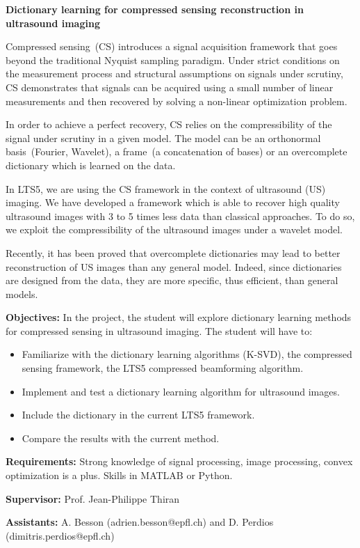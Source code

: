 \documentclass{article}
\newcommand\skipline{\vspace{\baselineskip}}
\begin{document}
\textbf{Dictionary learning for compressed sensing reconstruction in ultrasound imaging}

\skipline
\par Compressed sensing~(CS) introduces a signal acquisition framework that goes beyond the traditional Nyquist sampling paradigm. Under strict conditions on the measurement process and structural assumptions on signals under scrutiny, CS demonstrates that signals can be acquired using a small number of linear measurements and then recovered by solving a non-linear optimization problem.
\par In order to achieve a perfect recovery, CS relies on the compressibility of the signal under scrutiny in a given model. The model can be an orthonormal basis~(Fourier, Wavelet), a frame~(a concatenation of bases) or an overcomplete dictionary which is learned on the data. 
\par In LTS5, we are using the CS framework in the context of ultrasound (US) imaging. We have developed a framework which is able to recover high quality ultrasound images with 3 to 5 times less data than classical approaches. To do so, we exploit the compressibility of the ultrasound images under a wavelet model. 
\par Recently, it has been proved that overcomplete dictionaries may lead to better reconstruction of US images than any general model. Indeed, since dictionaries are designed from the data, they are more specific, thus efficient, than general models.

\skipline
\textbf{Objectives:} In the project, the student will explore dictionary learning methods for compressed sensing in ultrasound imaging. The student will have to:
\begin{itemize}
	\item Familiarize with the dictionary learning algorithms (K-SVD), the compressed sensing framework, the LTS5 compressed beamforming algorithm.
	\item Implement and test a dictionary learning algorithm for ultrasound images.
	\item Include the dictionary in the current LTS5 framework.
	\item Compare the results with the current method.
\end{itemize}

\textbf{Requirements:} Strong knowledge of signal processing, image processing, convex optimization is a plus. Skills in MATLAB or Python.

\textbf{Supervisor:} Prof. Jean-Philippe Thiran

\textbf{Assistants:} A. Besson (adrien.besson@epfl.ch) and D. Perdios (dimitris.perdios@epfl.ch)
\end{document}
